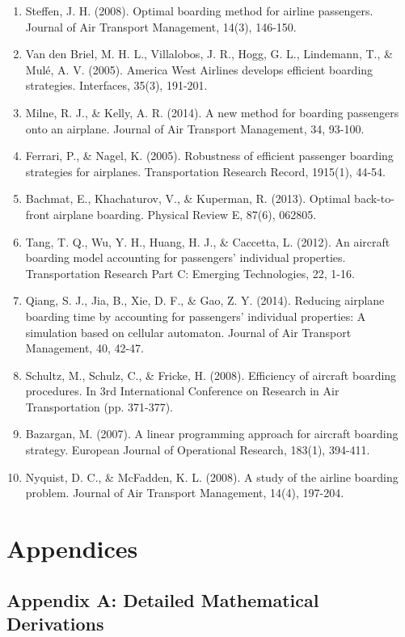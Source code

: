 \documentclass[12pt,a4paper]{article}
\begin{document}
\begin{enumerate}
    \item Steffen, J. H. (2008). Optimal boarding method for airline passengers. Journal of Air Transport Management, 14(3), 146-150.
    \item Van den Briel, M. H. L., Villalobos, J. R., Hogg, G. L., Lindemann, T., \& Mulé, A. V. (2005). America West Airlines develops efficient boarding strategies. Interfaces, 35(3), 191-201.
    \item Milne, R. J., \& Kelly, A. R. (2014). A new method for boarding passengers onto an airplane. Journal of Air Transport Management, 34, 93-100.
    \item Ferrari, P., \& Nagel, K. (2005). Robustness of efficient passenger boarding strategies for airplanes. Transportation Research Record, 1915(1), 44-54.
    \item Bachmat, E., Khachaturov, V., \& Kuperman, R. (2013). Optimal back-to-front airplane boarding. Physical Review E, 87(6), 062805.
    \item Tang, T. Q., Wu, Y. H., Huang, H. J., \& Caccetta, L. (2012). An aircraft boarding model accounting for passengers' individual properties. Transportation Research Part C: Emerging Technologies, 22, 1-16.
    \item Qiang, S. J., Jia, B., Xie, D. F., \& Gao, Z. Y. (2014). Reducing airplane boarding time by accounting for passengers' individual properties: A simulation based on cellular automaton. Journal of Air Transport Management, 40, 42-47.
    \item Schultz, M., Schulz, C., \& Fricke, H. (2008). Efficiency of aircraft boarding procedures. In 3rd International Conference on Research in Air Transportation (pp. 371-377).
    \item Bazargan, M. (2007). A linear programming approach for aircraft boarding strategy. European Journal of Operational Research, 183(1), 394-411.
    \item Nyquist, D. C., \& McFadden, K. L. (2008). A study of the airline boarding problem. Journal of Air Transport Management, 14(4), 197-204.
\end{enumerate}

\section{Appendices}
\subsection{Appendix A: Detailed Mathematical Derivations}
\end{document}
